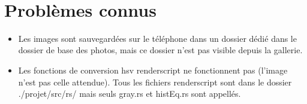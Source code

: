\documentclass[12pt]{article}
\begin{document}
\\

\section{Problèmes connus}

\begin{itemize}
    \item Les images sont sauvegardées sur le téléphone dans un dossier dédié dans le dossier de base des photos, mais ce dossier n'est pas visible depuis la gallerie.\\
    \item Les fonctions de conversion hsv renderscript ne fonctionnent pas (l'image n'est pas celle attendue). Tous les fichiers renderscript sont dans le dossier ./projet/src/rs/ mais seuls gray.rs et histEq.rs sont appellés.\\
\end{itemize}
\end{document}
